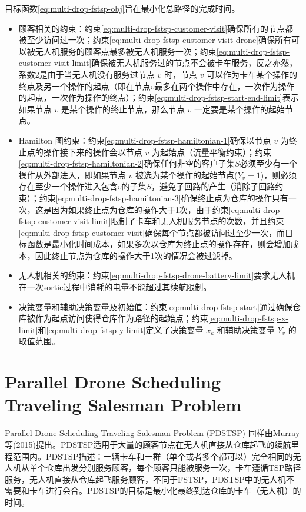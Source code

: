 目标函数\ref{eq:multi-drop-fstsp-obj}旨在最小化总路径的完成时间。

\begin{itemize}
    \item \colorbox{shallow-green}{顾客相关的约束：}约束\ref{eq:multi-drop-fstsp-customer-visit}确保所有的节点都被至少访问过一次；约束\ref{eq:multi-drop-fstsp-customer-visit-drone}确保所有可以被无人机服务的顾客点最多被无人机服务一次；约束\ref{eq:multi-drop-fstsp-customer-visit-limit}确保被无人机服务过的节点不会被卡车服务，反之亦然，系数2是由于当无人机没有服务过节点 $v$ 时，节点 $v$ 可以作为卡车某个操作的终点及另一个操作的起点（即在节点$v$最多在两个操作中存在，一次作为操作的起点，一次作为操作的终点）；约束\ref{eq:multi-drop-fstsp-start-end-limit}表示如果节点 $v$ 是某个操作的终止节点，那么节点 $v$ 一定要是某个操作的起始节点。 
    \item \colorbox{shallow-blue}{Hamilton 图\cite{HamiltonianPathWikiwand}约束：}约束\ref{eq:multi-drop-fstsp-hamiltonian-1}确保以节点 $v$ 为终止点的操作接下来的操作会以节点 $v$ 为起始点（流量平衡约束）；约束\ref{eq:multi-drop-fstsp-hamiltonian-2}确保任何非空的客户子集$S$必须至少有一个操作从外部进入，即如果节点 $v$ 被选为某个操作的起始节点($Y_v = 1$)，则必须存在至少一个操作进入包含$v$的子集$S$，避免子回路的产生（消除子回路约束）；约束\ref{eq:multi-drop-fstsp-hamiltonian-3}确保终止点为仓库的操作只有一次，这是因为如果终止点为仓库的操作大于1次，由于约束\ref{eq:multi-drop-fstsp-customer-visit-limit}限制了卡车和无人机服务节点的次数，并且约束\ref{eq:multi-drop-fstsp-customer-visit}确保每个节点都被访问过至少一次，而目标函数是最小化时间成本，如果多次以仓库为终止点的操作存在，则会增加成本，因此终止节点为仓库的操作大于1次的情况会被过滤掉。
    \item \colorbox{shallow-red}{无人机相关的约束：}约束\ref{eq:multi-drop-fstsp-drone-battery-limit}要求无人机在一次sortie过程中消耗的电量不能超过其续航限制。
    \item 决策变量和辅助决策变量及初始值：约束\ref{eq:multi-drop-fstsp-start}通过确保仓库被作为起点访问使得仓库作为路径的起始点；约束\ref{eq:multi-drop-fstsp-x-limit}和\ref{eq:multi-drop-fstsp-y-limit}定义了决策变量 $x_k$ 和辅助决策变量 $Y_v$ 的取值范围。 
\end{itemize}

\section{Parallel Drone Scheduling Traveling Salesman Problem}

Parallel Drone Scheduling Traveling Salesman Problem (PDSTSP) 同样由Murray等(2015)\cite{murrayFlyingSidekickTraveling2015}提出。PDSTSP适用于大量的顾客节点在无人机直接从仓库起飞的续航里程范围内。PDSTSP描述：一辆卡车和一群（单个或者多个都可以）完全相同的无人机从单个仓库出发分别服务顾客，每个顾客只能被服务一次，卡车遵循TSP路径服务，无人机直接从仓库起飞服务顾客，不同于FSTSP，PDSTSP中的无人机不需要和卡车进行会合。PDSTSP的目标是最小化最终到达仓库的卡车（无人机）的时间。

